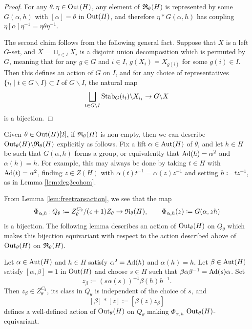 \begin{proof}
  For any $\theta, \eta \in \operatorname{Out}(H)$, any element of ${\mathfrak R}_{\theta}(H)$ is represented by some $G(\alpha, h)$ with $[\alpha] = \theta$ in $\operatorname{Out}(H)$, and therefore $\eta * G(\alpha, h)$ has coupling $\eta [\alpha] \eta^{-1} = \eta \theta \eta^{-1}$.

  The second claim follows from the following general fact. Suppose that $X$ is a left $G$-set, and $X = \sqcup_{i \in I} X_i$ is a disjoint union decomposition which is permuted by $G$, meaning that for any $g \in G$ and $i \in I$, $g(X_i) = X_{g(i)}$ for some $g(i) \in I$. Then this defines an action of $G$ on $I$, and for any choice of representatives $\{i_t \mid t \in G \backslash I\} \subset I$ of $G \backslash I$, the natural map
  \[
  \bigsqcup_{t \in G \setminus I} \operatorname{Stab}_{G}(i_t) \backslash X_{i_t} \rightarrow G \backslash X
  \]
  is a bijection.
\end{proof}

Given $\theta \in \operatorname{Out}(H)[2]$, if ${\mathfrak R}_{\theta}(H)$ is non-empty, then we can describe $\operatorname{Out}_{\theta}(H) \backslash {\mathfrak R}_{\theta}(H)$ explicitly as follows. Fix a lift $\alpha \in \operatorname{Aut}(H)$ of $\theta$, and let $h \in H$ be such that $G(\alpha,h)$ forms a group, or equivalently that $\operatorname{Ad}(h) = \alpha^2$ and $\alpha(h) = h$. For example, this may always be done by taking $t \in H$ with $\operatorname{Ad}(t) = \alpha^2$, finding $z \in Z(H)$ with $\alpha(t)t^{-1} = \alpha(z) z^{-1}$ and setting $h \coloneqq tz^{-1}$, as in Lemma \ref{lem:deg3cohom}.

From Lemma \ref{lem:freetransaction}, we see that the map
\[
\Phi_{\alpha, h} \colon Q_{\theta} \coloneqq Z_{\theta}^{C_2} / (\epsilon + 1)Z_{\theta} \rightarrow {\mathfrak R}_{\theta}(H), \qquad \Phi_{\alpha, h}(z) \coloneqq G(\alpha, z h)
\]
is a bijection. The following lemma describes an action of $\operatorname{Out}_{\theta}(H)$ on $Q_{\theta}$ which makes this bijection equivariant with respect to the action described above of $\operatorname{Out}_{\theta}(H)$ on ${\mathfrak R}_{\theta}(H)$.

\begin{lemma}\label{lem:torsoraction}
Let $\alpha\in\operatorname{Aut}(H)$ and $h\in H$ satisfy $\alpha^2=\operatorname{Ad}(h)$ and $\alpha(h)=h$. Let $\beta\in\operatorname{Aut}(H)$ satisfy
$[\alpha,\beta]=1$ in $\operatorname{Out}(H)$ and choose $s\in H$ such that $\beta\alpha\beta^{-1}=\operatorname{Ad}(s)\alpha$. Set
\[
z_\beta\coloneqq
(s\alpha(s))^{-1}\beta(h)h^{-1}.
\]
Then $z_\beta\in Z_\theta^{C_2}$, its class in $Q_{\theta}$ is independent of the choice of $s$, and
\[
[\beta]\ast[z]\coloneqq[\beta(z)z_\beta]
\]
defines a well-defined action of $\operatorname{Out}_\theta(H)$ on $Q_{\theta}$ making $\Phi_{\alpha,h}$ $\operatorname{Out}_\theta(H)$-equivariant.
\end{lemma}

